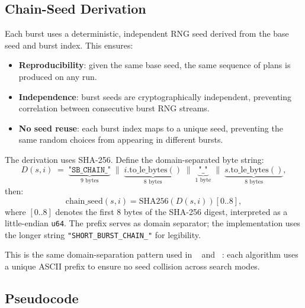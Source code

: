 \subsection{Chain-Seed Derivation}

Each burst uses a deterministic, independent RNG seed derived from the
base seed and burst index.
This ensures:
\begin{itemize}
\item \textbf{Reproducibility}: given the same base seed, the same
      sequence of plans is produced on any run.
\item \textbf{Independence}: burst seeds are cryptographically independent,
      preventing correlation between consecutive burst RNG streams.
\item \textbf{No seed reuse}: each burst index maps to a unique seed,
      preventing the same random choices from appearing in different bursts.
\end{itemize}

The derivation uses SHA-256.
Define the domain-separated byte string:
\[
  D(s, i) \;=\;
    \underbrace{\texttt{"SB\_CHAIN\_"}}_{\text{9 bytes}}
    \;\|\;
    \underbrace{i.\mathrm{to\_le\_bytes}()}_{\text{8 bytes}}
    \;\|\;
    \underbrace{\texttt{"\_"}}_{\text{1 byte}}
    \;\|\;
    \underbrace{s.\mathrm{to\_le\_bytes}()}_{\text{8 bytes}},
\]
then:
\[
  \mathrm{chain\_seed}(s, i) = \mathrm{SHA256}(D(s, i))[0..8],
\]
where $[0..8]$ denotes the first 8 bytes of the SHA-256 digest,
interpreted as a little-endian \texttt{u64}.
The prefix serves as domain separator; the implementation uses the
longer string \texttt{"SHORT\_BURST\_CHAIN\_"} for legibility.

This is the same domain-separation pattern used in \be{}~\citep{h1paper}
and \cs{}~\citep{b16paper}: each algorithm uses a unique ASCII prefix
to ensure no seed collision across search modes.

\subsection{Pseudocode}

